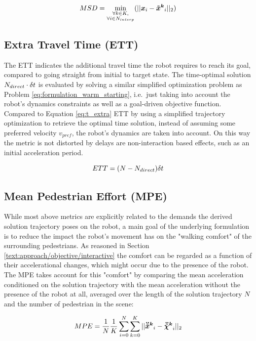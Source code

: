 \begin{equation}
MSD = \min_{\substack{\forall k \in K, \\ \forall i \in \stepssolution_{interp}}}(||\x_i - \xped[k]_i||_2) 
\end{equation}

\subsection{Extra Travel Time (ETT)}
The ETT indicates the additional travel time the robot requires to reach its goal, compared to going straight from initial to target state. The time-optimal solution $N_{direct} \cdot \delta t$ is evaluated by solving a similar simplified optimization problem as Problem \ref{eq:formulation_warm_starting}, i.e.\ just taking into account the robot's dynamics constraints as well as a goal-driven objective function. Compared to Equation \ref{eq:t_extra} ETT by using a simplified trajectory optimization to retrieve the optimal time solution, instead of assuming some preferred velocity $v_{pref}$, the robot's dynamics are taken into account. On this way the metric is not distorted by delays are non-interaction based effects, such as an initial acceleration period.  

\begin{equation}
ETT = (N - N_{direct})\delta t
\end{equation} 

\subsection{Mean Pedestrian Effort (MPE)}
While most above metrics are explicitly related to the demands the derived solution trajectory poses on the robot, a main goal of the underlying formulation is to reduce the impact the robot's movement has on the "walking comfort" of the surrounding pedestrians. As reasoned in Section \ref{text:approach/objective/interactive} the comfort can be regarded as a function of their accelerational changes, which might occur due to the presence of the robot. The MPE takes account for this "comfort" by comparing the mean acceleration conditioned on the solution trajectory with the mean acceleration without the presence of the robot at all, averaged over the length of the solution trajectory $N$ and the number of pedestrian in the scene:

\begin{equation}
MPE = \frac{1}{\stepssolution} \frac{1}{K} \sum_{i=0}^{\stepssolution} \sum_{k=0}^K ||\ddxped[k]_i - \ddxpedwo[k]_i||_2
\end{equation}

